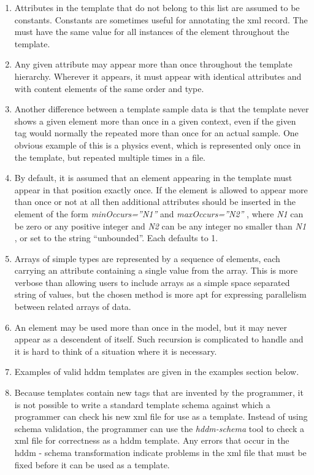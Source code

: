\documentclass[10pt]{article}
\begin{document}
\begin{enumerate}
\item  Attributes in the template that do not belong to this list are assumed to be constants. Constants are sometimes useful for annotating the xml record. The must have the same value for all instances of the element throughout the template. 
\item  Any given attribute may appear more than once throughout the template hierarchy. Wherever it appears, it must appear with identical attributes and with content elements of the same order and type. 
\item  Another difference between a template sample data is that the template never shows a given element more than once in a given context, even if the given tag would normally the repeated more than once for an actual sample. One obvious example of this is a physics event, which is represented only once in the template, but repeated multiple times in a file. 
\item  By default, it is assumed that an element appearing in the template must appear in that position exactly once. If the element is allowed to appear more than once or not at all then additional attributes should be inserted in the element of the form \emph{minOccurs=''N1''}
 and \emph{maxOccurs=''N2''}
, where \emph{N1}
 can be zero or any positive integer and \emph{N2}
 can be any integer no smaller than \emph{N1}
, or set to the string ``unbounded''. Each defaults to 1. 
\item  Arrays of simple types are represented by a sequence of elements, each carrying an attribute containing a single value from the array. This is more verbose than allowing users to include arrays as a simple space separated string of values, but the chosen method is more apt for expressing parallelism between related arrays of data. 
\item  An element may be used more than once in the model, but it may never appear as a descendent of itself. Such recursion is complicated to handle and it is hard to think of a situation where it is necessary. 
\item  Examples of valid hddm templates are given in the examples section below. 
\item  Because templates contain new tags that are invented by the programmer, it is not possible to write a standard template schema against which a programmer can check his new xml file for use as a template. Instead of using schema validation, the programmer can use the \emph{hddm-schema}
 tool to check a xml file for correctness as a hddm template. Any errors that occur in the hddm - schema transformation indicate problems in the xml file that must be fixed before it can be used as a template. 

\end{enumerate}
\end{document}
